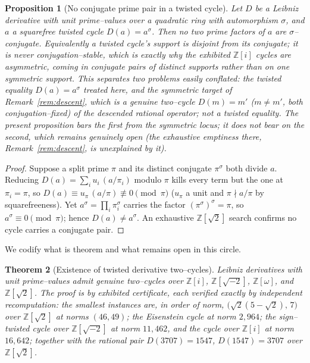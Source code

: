\documentclass[11pt]{article}
\newtheorem{theorem}{Theorem}[section]
\newtheorem{proposition}[theorem]{Proposition}
\theoremstyle{definition}
\begin{document}
\begin{proposition}[No conjugate prime pair in a twisted cycle]\label{prop:noconj}
Let $D$ be a Leibniz derivative with unit prime--values over a quadratic ring with automorphism $\sigma$,
and $a$ a squarefree twisted cycle $D(a)=a^\sigma$. Then no two prime factors of $a$ are
$\sigma$--conjugate. Equivalently a twisted cycle's support is disjoint from its conjugate; it is never
conjugation--stable, which is exactly why the exhibited $\mathbb{Z}[i]$ cycles are asymmetric, coming in
conjugate pairs of \emph{distinct} supports rather than on one symmetric support. This \emph{separates}
two problems easily conflated: the twisted equality $D(a)=a^\sigma$ treated here, and the symmetric
target of Remark~\ref{rem:descent}, which is a genuine two--cycle $D(m)=m'$ ($m\ne m'$, both
conjugation--fixed) of the \emph{descended} rational operator; not a twisted equality. The present
proposition bars the first from the symmetric locus; it does not bear on the second, which remains
genuinely open (the exhaustive emptiness there, Remark~\ref{rem:descent}, is unexplained by it).
\end{proposition}
\begin{proof}
Suppose a split prime $\pi$ and its distinct conjugate $\pi^\sigma$ both divide $a$. Reducing
$D(a)=\sum_i u_i\,(a/\pi_i)$ modulo $\pi$ kills every term but the one at $\pi_i=\pi$, so
$D(a)\equiv u_\pi\,(a/\pi)\not\equiv0\pmod\pi$ ($u_\pi$ a unit and $\pi\nmid a/\pi$ by squarefreeness).
Yet $a^\sigma=\prod_i\pi_i^\sigma$ carries the factor $(\pi^\sigma)^\sigma=\pi$, so
$a^\sigma\equiv0\pmod\pi$; hence $D(a)\ne a^\sigma$. An exhaustive $\mathbb{Z}[\sqrt2]$ search confirms
no cycle carries a conjugate pair.
\end{proof}

We codify what is theorem and what remains open in this circle.

\begin{theorem}[Existence of twisted derivative two--cycles]\label{thm:existence}
Leibniz derivatives with unit prime--values admit genuine two--cycles over $\mathbb{Z}[i]$,
$\mathbb{Z}[\sqrt{-2}]$, $\mathbb{Z}[\omega]$, and $\mathbb{Z}[\sqrt2]$. The proof is by exhibited
certificate, each verified exactly by independent recomputation: the smallest instances are, in order of
norm, $\bigl(\sqrt2(5-\sqrt2),\,7\bigr)$ over $\mathbb{Z}[\sqrt2]$ at norms $(46,49)$; the Eisenstein
cycle at norm $2{,}964$; the sign--twisted cycle over $\mathbb{Z}[\sqrt{-2}]$ at norm $11{,}462$, and the
cycle over $\mathbb{Z}[i]$ at norm $16{,}642$; together with the rational pair
$D(3707)=1547$, $D(1547)=3707$ over $\mathbb{Z}[\sqrt2]$.
\end{theorem}
\end{document}
